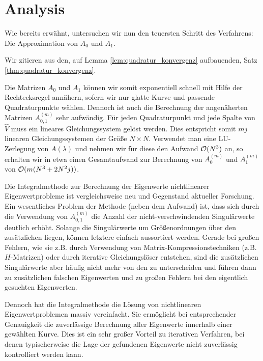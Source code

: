 \section{Analysis}

Wie bereits erwähnt, untersuchen wir nun den teuersten Schritt des Verfahrens:
Die Approximation von $A_0$ und $A_1$.




Wir zitieren aus \cite{EWPs} den, auf Lemma \ref{lem:quadratur_konvergenz} aufbauenden, Satz \ref{thm:quadratur_konvergenz}.



Die Matrizen $A_0$ und $A_1$ können wir somit exponentiell schnell mit Hilfe der Rechtecksregel annähern, sofern wir nur glatte Kurve und passende Quadraturpunkte wählen.
Dennoch ist auch die Berechnung der angenäherten Matrizen $A_{0, 1}^{(m)}$ sehr aufwändig.
Für jeden Quadraturpunkt und jede Spalte von $\hat V$ muss ein lineares Gleichungssystem gelöst werden.
Dies entspricht somit $m j$ linearen Gleichungssystemen der Größe $N \times N$.
Verwendet man eine LU-Zerlegung von $A(\lambda)$ und nehmen wir für diese den Aufwand $\mathcal{O}(N^3)$ an, so erhalten wir in etwa einen Gesamtaufwand zur Berechnung von $A_0^{(m)}$ und $A_1^{(m)}$ von $\mathcal{O}(m (N^3 + 2 N^2 j))$.

Die Integralmethode zur Berechnung der Eigenwerte nichtlinearer Eigenwertprobleme ist vergleichsweise neu und Gegenstand aktueller Forschung.
Ein wesentliches Problem der Methode (neben dem Aufwand) ist, dass sich durch die Verwendung von $A_{0, 1}^{(m)}$ die Anzahl der nicht-verschwindenden Singulärwerte deutlich erhöht.
Solange die  Singulärwerte um Größenordnungen über den zusätzlichen liegen, können letztere einfach aussortiert werden.
Gerade bei großen Fehlern, wie sie z.B. durch Verwendung von Matrix-Kompressionstechniken (z.B. $H$-Matrizen) oder durch iterative Gleichungslöser entstehen, sind die zusätzlichen Singulärwerte aber häufig nicht mehr von den  zu unterscheiden und führen dann zu zusätzlichen falschen Eigenwerten und zu großen Fehlern bei den eigentlich gesuchten Eigenwerten.

Dennoch hat die Integralmethode die Lösung von nichtlinearen Eigenwertproblemen massiv vereinfacht.
Sie ermöglicht bei entsprechender Genauigkeit die zuverlässige Berechnung aller Eigenwerte innerhalb einer gewählten Kurve.
Dies ist ein sehr großer Vorteil zu iterativen Verfahren, bei denen typischerweise die Lage der gefundenen Eigenwerte nicht zuverlässig kontrolliert werden kann.

